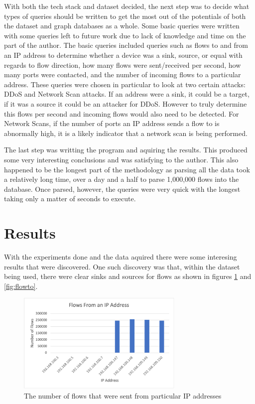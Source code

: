\documentclass[conference]{IEEEtran}
\begin{document}
With both the tech stack and dataset decided, the next step was to decide what types of queries should be
written to get the most out of the potentials of both the dataset and graph databases as a whole. Some basic
queries were written with some queries left to future work due to lack of knowledge and time on the part of 
the author. The basic queries included queries such as flows to and from an IP address to determine whether
a device was a sink, source, or equal with regards to flow direction, how many flows were sent/received per
second, how many ports were contacted, and the number of incoming flows to a particular address. These queries
were chosen in particular to look at two certain attacks: DDoS and Network Scan attacks. If an address were a 
sink, it could be a target, if it was a source it could be an attacker for DDoS. However to truly determine this
flows per second and incoming flows would also need to be detected. For Network Scans, if the number of ports
an IP address sends a flow to is abnormally high, it is a likely indicator that a network scan is being performed.

The last step was writting the program and aquiring the results. This produced some very interesting conclusions
and was satisfying to the author. This also happened to be the longest part of the methodology as parsing all the
data took a relatively long time, over a day and a half to parse 1,000,000 flows into the database. Once parsed,
however, the queries were very quick with the longest taking only a matter of seconds to execute.

\section{Results}

With the experiments done and the data aquired there were some interesing results that were discovered. One such
discovery was that, within the dataset being used, there were clear sinks and sources for flows as shown in figures
\ref{fig:flowfrom} and \ref{fig:flowto}.

\begin{figure}[h]
    \includegraphics[width=8cm]{Figure1.png}
    \centering
    \caption{The number of flows that were sent from particular IP addresses}
    \label{fig:flowfrom}
\end{figure}
\end{document}
